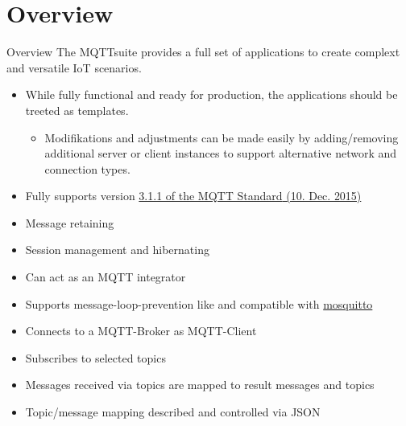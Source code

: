 ﻿\part[nopartpage]{Overview}

\begin{frame}{Overview}
    The \alert{MQTTsuite} provides a full \alert{set of applications} to create complext and versatile \alert{IoT scenarios}.
    \begin{itemize}
        \item While \alert{fully functional} and \alert{ready for production}, the applications should be \alert{treeted as templates}.
        \begin{itemize}
            \item \alert{Modifikations} and \alert{adjustments} can be made easily by \alert{adding/removing} additional \alert{server or client} instances to support \alert{alternative network and connection} types.
    \end{itemize}
    \end{itemize}
    \begin{description}[MQTTintegrator]
        \item [MQTTbroker]
        \begin{itemize}
            \item Fully supports version \href{https://docs.oasis-open.org/mqtt/mqtt/v3.1.1/mqtt-v3.1.1.html}{\textcolor{fh-ooe-red}{3.1.1 of the MQTT Standard} (10. Dec. 2015)}
            \item Message \alert{retaining}
            \item Session \alert{management} and \alert{hibernating}
            \item Can \alert{act as} an MQTT \alert{integrator}
            \item Supports \alert{message-loop-prevention} like and compatible with \href{https://mosquitto.org/}{\textcolor{fh-ooe-red}{mosquitto}}
        \end{itemize}
        \item [MQTTintegrator]
        \begin{itemize}
            \item Connects to a MQTT-Broker as MQTT-Client
            \item \alert{Subscribes} to selected \alert{topics}
            \item \alert{Messages} received via \alert{topics} are \alert{mapped} to \alert{result messages and topics}
            \item Topic/message \alert{mapping described} and controlled \alert{via JSON}

\end{itemize}
\end{description}
\end{frame}
